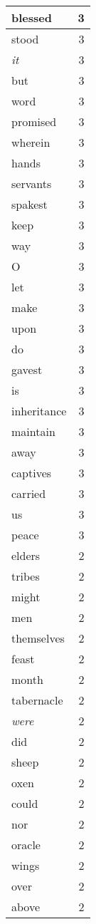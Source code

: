 \begin{center}
\begin{longtable}{l|r}
blessed & 3 \\ \hline
stood & 3 \\ \hline
\emph{it} & 3 \\ \hline
but & 3 \\ \hline
word & 3 \\ \hline
promised & 3 \\ \hline
wherein & 3 \\ \hline
hands & 3 \\ \hline
servants & 3 \\ \hline
spakest & 3 \\ \hline
keep & 3 \\ \hline
way & 3 \\ \hline
O & 3 \\ \hline
let & 3 \\ \hline
make & 3 \\ \hline
upon & 3 \\ \hline
do & 3 \\ \hline
gavest & 3 \\ \hline
is & 3 \\ \hline
inheritance & 3 \\ \hline
maintain & 3 \\ \hline
away & 3 \\ \hline
captives & 3 \\ \hline
carried & 3 \\ \hline
us & 3 \\ \hline
peace & 3 \\ \hline
elders & 2 \\ \hline
tribes & 2 \\ \hline
might & 2 \\ \hline
men & 2 \\ \hline
themselves & 2 \\ \hline
feast & 2 \\ \hline
month & 2 \\ \hline
tabernacle & 2 \\ \hline
\emph{were} & 2 \\ \hline
did & 2 \\ \hline
sheep & 2 \\ \hline
oxen & 2 \\ \hline
could & 2 \\ \hline
nor & 2 \\ \hline
oracle & 2 \\ \hline
wings & 2 \\ \hline
over & 2 \\ \hline
above & 2 \\ \hline

\end{longtable}
\end{center}
